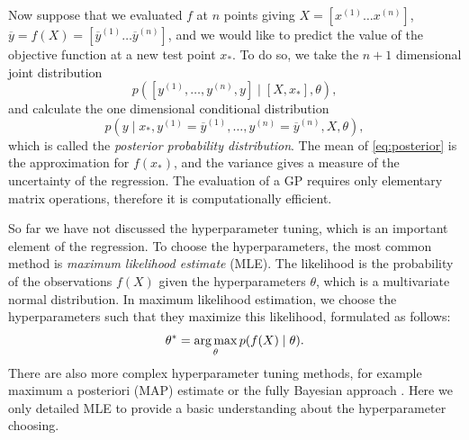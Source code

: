 Now suppose that we evaluated $f$ at $n$ points giving $X=[x^{(1)}\dots x^{(n)}]$, $\overline y =f(X) = [\overline y^{(1)}\dots \overline y^{(n)}]$, and we would like to predict the value of the objective function at a new test point $x_*$. To do so, we take the $n+1$ dimensional joint distribution $$p([y^{(1)},\dots,y^{(n)},y ] \mid [X,x_*],\theta),$$ and calculate the one dimensional conditional distribution 
\begin{equation}\label{eq:posterior}
    p(y\mid x_*,y^{(1)}=\overline y^{(1)}, \dots ,y^{(n)}=\overline y^{(n)},X,\theta ),
\end{equation}
 which is called the \textit{posterior probability distribution}. The mean of \eqref{eq:posterior} is the approximation for $f(x_*)$, and the variance gives a measure of the uncertainty of the regression. The evaluation of a GP requires only elementary matrix operations, therefore it is computationally efficient. 

So far we have not discussed the hyperparameter tuning, which is an important element of the regression. To choose the hyperparameters, the most common method is \textit{maximum likelihood estimate} (MLE). The likelihood is the probability of the observations $f(X)$ given the hyperparameters $\theta$, which is a multivariate normal distribution. In maximum likelihood estimation, we choose the hyperparameters such that they maximize this likelihood, formulated as follows:
\begin{equation}
    \theta^* = \operatorname*{arg\,max}_\theta p(f(X)\mid \theta).  
\end{equation}
There are also more complex hyperparameter tuning methods, for example maximum a posteriori (MAP) estimate or the fully Bayesian approach \cite{RW2006}. Here we only detailed MLE to provide a basic understanding about the hyperparameter choosing.


